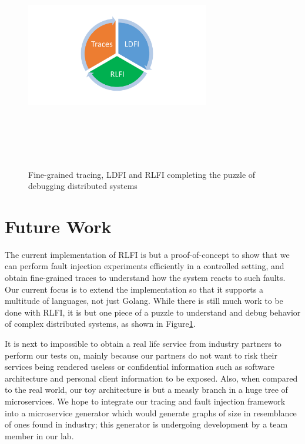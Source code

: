 

\begin{figure}
\centering
\includegraphics[width=8cm,height=10cm,keepaspectratio=true]{puzzle}
\caption{Fine-grained tracing, LDFI and RLFI completing the puzzle of debugging distributed systems}
\label{puzzle}
\end{figure}

\section{Future Work}
The current implementation of RLFI is but a proof-of-concept to show that we can perform fault injection experiments efficiently in a controlled setting, and obtain fine-grained traces to understand how the system reacts to such faults. Our current focus is to extend the implementation so that it supports a multitude of languages, not just Golang. While there is still much work to be done with RLFI, it is but one piece of a puzzle to understand and debug behavior of complex distributed systems, as shown in Figure\ref{puzzle}.

It is next to impossible to obtain a real life service from industry partners to perform our tests on, mainly because our partners do not want to risk their services being rendered useless or confidential information such as software architecture and personal client information to be exposed. Also, when compared to the real world, our toy architecture is but a measly branch in a huge tree of microservices. We hope to integrate our tracing and fault injection framework into a microservice generator which would generate graphs of size in resemblance of ones found in industry; this generator is undergoing development by a team member in our lab.

